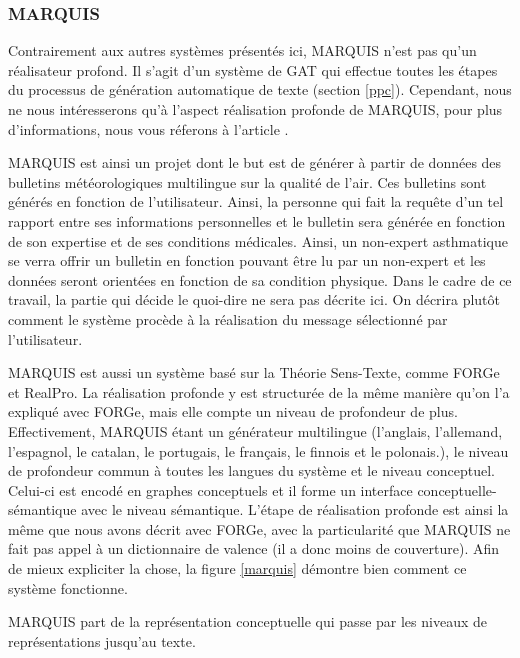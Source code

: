 \subsubsection{MARQUIS} \label{sectionmarquis}

Contrairement aux autres systèmes présentés ici, MARQUIS n'est pas qu'un réalisateur profond. Il s'agit d'un système de \ac{GAT} qui effectue toutes les étapes du processus de génération automatique de texte (section \ref{ppc}). Cependant, nous ne nous intéresserons qu'à l'aspect réalisation profonde de MARQUIS, pour plus d'informations, nous vous réferons à l'article \citep{WannerMARQUISGENERATIONUSERTAILORED2010}. 

MARQUIS est ainsi un projet dont le but est de générer à partir de données des bulletins météorologiques multilingue sur la qualité de l'air. Ces bulletins sont générés en fonction de l'utilisateur. Ainsi, la personne qui fait la requête d'un tel rapport entre ses informations personnelles et le bulletin sera générée en fonction de son expertise et de ses conditions médicales. Ainsi, un non-expert asthmatique se verra offrir un bulletin en fonction pouvant être lu par un non-expert et les données seront orientées en fonction de sa condition physique. Dans le cadre de ce travail, la partie qui décide le quoi-dire ne sera pas décrite ici. On décrira plutôt comment le système procède à la réalisation du message sélectionné par l'utilisateur.

MARQUIS est aussi un système basé sur la Théorie Sens-Texte, comme FORGe et RealPro. La réalisation profonde y est structurée de la même manière qu'on l'a expliqué avec FORGe, mais elle compte un niveau de profondeur de plus. Effectivement, MARQUIS étant un générateur multilingue (l'anglais, l'allemand, l'espagnol, le catalan, le portugais, le français, le finnois et le polonais.), le niveau de profondeur commun à toutes les langues du système et le niveau conceptuel. Celui-ci est encodé en graphes conceptuels et il forme un interface conceptuelle-sémantique avec le niveau sémantique. L'étape de réalisation profonde est ainsi la même que nous avons décrit avec FORGe, avec la particularité que MARQUIS ne fait pas appel à un dictionnaire de valence (il a donc moins de couverture). Afin de mieux expliciter la chose, la figure \ref{marquis} démontre bien comment ce système fonctionne.

MARQUIS part de la représentation conceptuelle qui passe par les niveaux de représentations jusqu'au texte.

